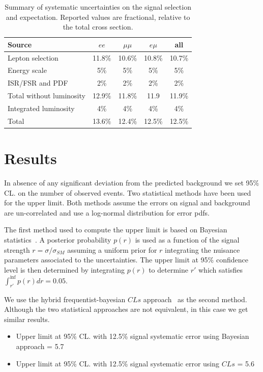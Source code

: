 \begin{table}[h]
\begin{center}
\begin{tabular}{lcccc}\hline
Source 					& $ee$		& $\mu\mu$		& $e\mu$			& all \\ \hline
Lepton selection			& 11.8\%		& 10.6\%		& 10.8\%			& 10.7\% \\
Energy scale				& 5\%		& 5\%		& 5\%			& 5\% \\
ISR/FSR and PDF				& 2\%		& 2\%		& 2\%			& 2\% 	\\
Total without luminosity		& 12.9\%		& 11.8\%		& 11.9	& 11.9\%	\\ \hline
Integrated luminosity			& 4\%		& 4\%		& 4\%			& 4\%	\\ \hline
Total & 13.6\% & 12.4\% & 12.5\%  & 12.5\% \\
\hline
\end{tabular}
\caption{\small\label{tab:systSumm}Summary of systematic uncertainties on the signal selection and
expectation. Reported values are fractional, relative to the total cross section.}
\end{center}
\end{table}

\section{Results}
\label{sec:ssresults}

In absence of any significant deviation from the predicted background we set 95\% CL. on 
the number of observed events. Two statistical methods have been used for the upper limit. Both 
methods assume the errors on signal and background are un-correlated and use a log-normal
distribution for error pdfs. 

The first method used to compute the upper limit is based on Bayesian statistics~\cite{bayesian}.
A posterior probability $p(r)$ is used as a function of the signal strength $r = \sigma/\sigma_{SM}$ 
assuming a uniform prior for $r$ integrating the nuisance parameters associated to the uncertainties.
The upper limit at 95\% confidence level is then determined by integrating $p(r)$ to determine $r'$ which
satisfies $\int_{r'}^{\inf} p(r) dr = 0.05$.

We use the hybrid frequentist-bayesian $CLs$ approach~\cite{CLS} as the second method. Although the two 
statistical approaches are not equivalent, in this case we get similar results. 

\begin{itemize}
\item Upper limit at 95\% CL. with 12.5\% signal systematic error using Bayesian approach = 5.7  
\item Upper limit at 95\% CL. with 12.5\% signal systematic error using $CLs$ = 5.6  
\end{itemize}


